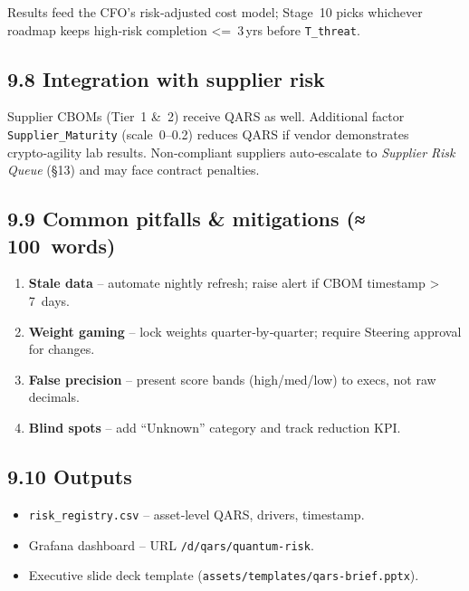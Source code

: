 \documentclass[
  english,
]{article}
\providecommand{\tightlist}{%
  \setlength{\itemsep}{0pt}\setlength{\parskip}{0pt}}
\begin{document}
Results feed the CFO's risk‑adjusted cost model; Stage~10 picks
whichever roadmap keeps high‑risk completion \textless=~3\,yrs before
\texttt{T\_threat}.

\subsection{9.8 Integration with supplier
risk}\label{integration-with-supplier-risk}

Supplier CBOMs (Tier~1 \&~2) receive QARS as well. Additional factor
\texttt{Supplier\_Maturity} (scale~0--0.2) reduces QARS if vendor
demonstrates crypto‑agility lab results. Non‑compliant suppliers
auto‑escalate to \emph{Supplier Risk Queue} (§13) and may face contract
penalties.

\subsection{9.9 Common pitfalls \& mitigations
(≈\,100~words)}\label{common-pitfalls-mitigations-100-words}

\begin{enumerate}
\def\labelenumi{\arabic{enumi}.}
\tightlist
\item
  \textbf{Stale data} -- automate nightly refresh; raise alert if CBOM
  timestamp \textgreater\,7~days.
\item
  \textbf{Weight gaming} -- lock weights quarter‑by‑quarter; require
  Steering approval for changes.
\item
  \textbf{False precision} -- present score bands (high/med/low) to
  execs, not raw decimals.
\item
  \textbf{Blind spots} -- add ``Unknown'' category and track reduction
  KPI.
\end{enumerate}

\subsection{9.10 Outputs}\label{outputs-1}

\begin{itemize}
\tightlist
\item
  \texttt{risk\_registry.csv} -- asset‑level QARS, drivers, timestamp.
\item
  Grafana dashboard -- URL \texttt{/d/qars/quantum‑risk}.
\item
  Executive slide deck template
  (\texttt{assets/templates/qars‑brief.pptx}).
\end{itemize}
\end{document}
